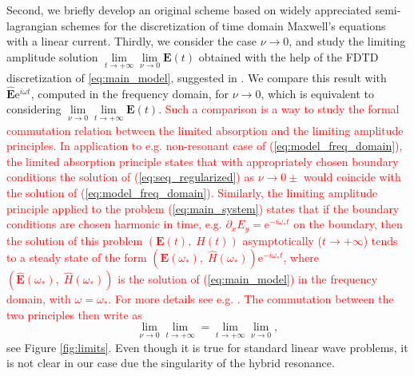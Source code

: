 Second, we briefly develop an original scheme based on widely appreciated semi-lagrangian schemes
for the discretization of time domain Maxwell's equations with a linear current.
Thirdly, we consider the case $\nu\rightarrow 0$, and study the limiting amplitude solution 
$\lim\limits_{t\rightarrow +\infty}\lim\limits_{\nu\rightarrow 0}\mathbf{E}(t)$ obtained with the help of 
the FDTD discretization of \eqref{eq:main_model}, suggested in \cite{stable_yee_plasma_current}. 
We compare this result with 
$\hat{\mathbf{E}}\mathrm{e}^{i\omega t}$, computed in the frequency domain, for $\nu\rightarrow 0$, which is equivalent to considering
$\lim\limits_{\nu\rightarrow 0}\lim\limits_{t\rightarrow+\infty}\mathbf{E}(t)$.
\textcolor{red}{Such a comparison is a way to study the formal commutation relation between the limited absorption and the limiting amplitude principles. 
In application to e.g. non-resonant case of (\ref{eq:model_freq_domain}), the limited absorption principle states that with 
appropriately chosen boundary conditions the solution of (\ref{eq:seq_regularized}) 
as $\nu\rightarrow 0\pm$ 
would coincide with the solution of (\ref{eq:model_freq_domain}). Similarly, the limiting amplitude principle applied to the problem (\ref{eq:main_system}) 
states that if the boundary conditions are chosen harmonic in time, e.g. $\partial_x E_y=\mathrm{e}^{-i\omega_{*} t}$ on 
the boundary, then the solution of this problem $(\mathbf{E}(t),\;H(t))$ asymptotically ($t\rightarrow +\infty$)
tends to a steady state of the form $ \left(\mathbf{E}(\omega_{*}),\; \hat{H}(\omega_{*})\right)\mathrm{e}^{-i\omega_{*} t}$, where 
$\left(\hat{\mathbf{E}}(\omega_{*}),\; \hat{H}(\omega_{*})\right)$ is the solution of (\ref{eq:main_model})
in the frequency domain, with $\omega=\omega_{*}$. For more details see e.g. \cite{Morawetz, Eidus}. The commutation between the two principles then write as}
$$
\lim\limits_{\nu\rightarrow 0}\lim\limits_{t\rightarrow+\infty}= \lim\limits_{t\rightarrow+\infty}\lim\limits_{\nu\rightarrow 0},
$$
see Figure \ref{fig:limits}. 
Even though it is true for standard linear wave problems, it is not clear  in our case due the singularity
of the hybrid resonance.
